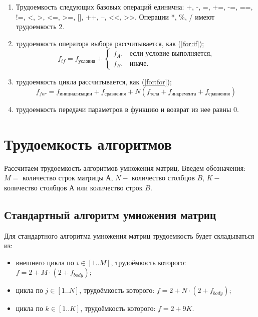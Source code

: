 \begin{enumerate}
	\item Трудоемкость следующих базовых операций единична:
	+, -, =, +=, -=, ==, !=, <, >, <=, >=, [], ++, --, <<, >>.
	Операции *, \%, / имеют трудоемкость 2.
	\item трудоемкость оператора выбора  рассчитывается, как (\ref{for:if});
	\begin{equation}
		\label{for:if}
		f_{if} = f_{\text{условия}} +
		\begin{cases}
			f_A, & \text{если условие выполняется,}\\
			f_B, & \text{иначе.}
		\end{cases}
	\end{equation}
	\item трудоемкость цикла рассчитывается, как (\ref{for:for});
	\begin{equation}
		\label{for:for}
		f_{for} = f_{\text{инициализации}} + f_{\text{сравнения}} + N(f_{\text{тела}} + f_{\text{инкремента}} + f_{\text{сравнения}})
	\end{equation}
	\item трудоемкость передачи параметров в функцию и возврат из нее равны 0.
\end{enumerate}


\section{Трудоемкость алгоритмов}

Рассчитаем трудоемкость алгоритмов умножения матриц. Введем обозначения: $M =$ количество строк матрицы $А$, $N -$ количество столбцов $B$, $K -$ количество столбцов $А$ или количество строк $B$.

\subsection{Стандартный алгоритм умножения матриц}

Для стандартного алгоритма умножения матриц трудоемкость будет складываться из:

\begin{itemize}
	\item внешнего цикла по $i \in [1..M]$, трудоёмкость которого: $f = 2 + M \cdot (2 + f_{body})$;
	\item цикла по $j \in [1..N]$, трудоёмкость которого: $f = 2 + N \cdot (2 + f_{body})$;
	\item цикла по $k \in [1..K]$, трудоёмкость которого: $f = 2 + 9K$. \newline
\end{itemize}

